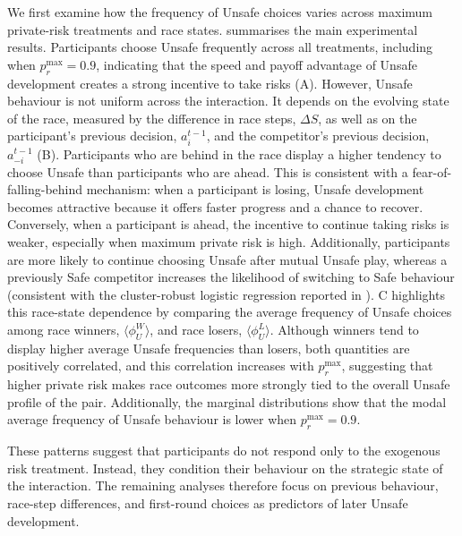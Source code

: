 \documentclass[pdflatex,sn-mathphys-ay]{sn-jnl}
\theoremstyle{thmstyleone}
\theoremstyle{thmstyletwo}
\theoremstyle{thmstylethree}
\begin{document}
We first examine how the frequency of Unsafe choices varies across maximum private-risk treatments and race states.  summarises the main experimental results. Participants choose Unsafe frequently across all treatments, including when $p_r^{\max}=0.9$, indicating that the speed and payoff advantage of Unsafe development creates a strong incentive to take risks (A). However, Unsafe behaviour is not uniform across the interaction. It depends on the evolving state of the race, measured by the difference in race steps, $\Delta S$, as well as on the participant's previous decision, $a_i^{t-1}$, and the competitor's previous decision, $a_{-i}^{t-1}$ (B). Participants who are behind in the race display a higher tendency to choose Unsafe than participants who are ahead. This is consistent with a fear-of-falling-behind mechanism: when a participant is losing, Unsafe development becomes attractive because it offers faster progress and a chance to recover. Conversely, when a participant is ahead, the incentive to continue taking risks is weaker, especially when maximum private risk is high. Additionally, participants are more likely to continue choosing Unsafe after mutual Unsafe play, whereas a previously Safe competitor increases the likelihood of switching to Safe behaviour (consistent with the cluster-robust logistic regression reported in ). C highlights this race-state dependence by comparing the average frequency of Unsafe choices among race winners, $\langle \phi_U^W \rangle$, and race losers, $\langle \phi_U^L \rangle$. Although winners tend to display higher average Unsafe frequencies than losers, both quantities are positively correlated, and this correlation increases with $p_r^{\max}$, suggesting that higher private risk makes race outcomes more strongly tied to the overall Unsafe profile of the pair. Additionally, the marginal distributions show that the modal average frequency of Unsafe behaviour is lower when $p_r^{\max}=0.9$.

These patterns suggest that participants do not respond only to the exogenous risk treatment. Instead, they condition their behaviour on the strategic state of the interaction. The remaining analyses therefore focus on previous behaviour, race-step differences, and first-round choices as predictors of later Unsafe development.
\end{document}
